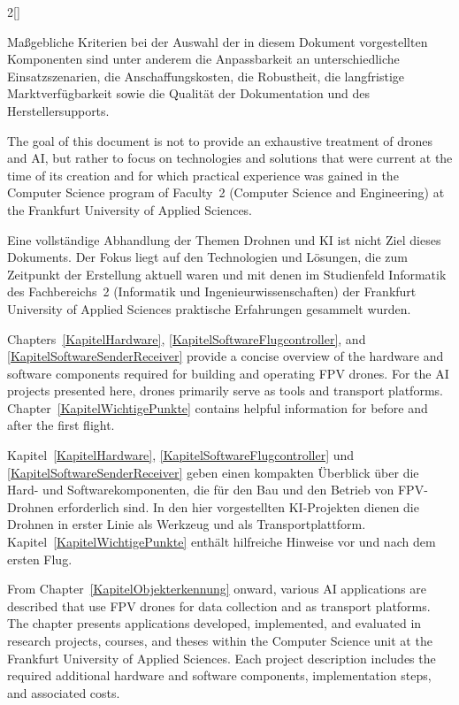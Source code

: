 \begin{paracol}{2}[]
\colger

Maßgebliche Kriterien bei der Auswahl der in diesem Dokument vorgestellten Komponenten sind unter anderem die Anpassbarkeit an unterschiedliche Einsatzszenarien, die Anschaffungskosten, die Robustheit, die langfristige Marktverfügbarkeit sowie die Qualität der Dokumentation und des Herstellersupports.

\coleng

The goal of this document is not to provide an exhaustive treatment of drones and AI, but rather to focus on technologies and solutions that were current at the time of its creation and for which practical experience was gained in the Computer Science program of Faculty~2 (Computer Science and Engineering) at the Frankfurt University of Applied Sciences.

\colger

Eine vollständige Abhandlung der Themen Drohnen und KI ist nicht Ziel dieses Dokuments. Der Fokus liegt auf den Technologien und Lösungen, die zum Zeitpunkt der Erstellung aktuell waren und mit denen im Studienfeld Informatik des Fachbereichs~2 (Informatik und Ingenieurwissenschaften) der Frankfurt University of Applied Sciences praktische Erfahrungen gesammelt wurden.

\coleng

Chapters~\ref{KapitelHardware}, \ref{KapitelSoftwareFlugcontroller}, and \ref{KapitelSoftwareSenderReceiver} provide a concise overview of the hardware and software components required for building and operating FPV drones. For the AI projects presented here, drones primarily serve as tools and transport platforms. Chapter~\ref{KapitelWichtigePunkte} contains helpful information for before and after the first flight.

\colger

Kapitel~\ref{KapitelHardware}, \ref{KapitelSoftwareFlugcontroller} und \ref{KapitelSoftwareSenderReceiver} geben einen kompakten Überblick über die Hard- und Softwarekomponenten, die für den Bau und den Betrieb von FPV-Drohnen erforderlich sind. In den hier vorgestellten KI-Projekten dienen die Drohnen in erster Linie als Werkzeug und als Transportplattform. Kapitel~\ref{KapitelWichtigePunkte} enthält hilfreiche Hinweise vor und nach dem ersten Flug.

\coleng

From Chapter~\ref{KapitelObjekterkennung} onward, various AI applications are described that use FPV drones for data collection and as transport platforms. The chapter presents applications developed, implemented, and evaluated in research projects, courses, and theses within the Computer Science unit at the Frankfurt University of Applied Sciences. Each project description includes the required additional hardware and software components, implementation steps, and associated costs.


\end{paracol}
